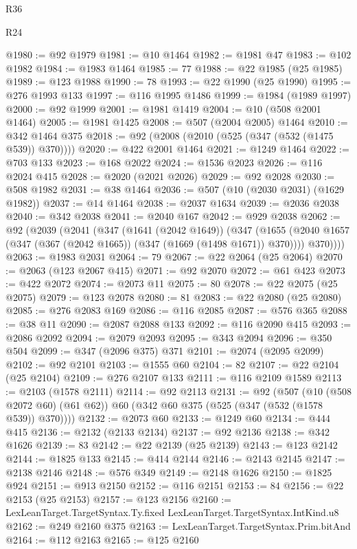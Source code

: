 \begin{lexlean}{R36}
\begin{lexlean}{R24}
\begin{coremodule}
{{{{{{{{{{{{{{{{{{{{{{{{{{{{{{{{{{{{{{{{{{{{{{{{{{{{{{{{{{{{{{{{{{{{{{{{{{{{{{{{{{{{{{{{{{{{{{{{{{{{{{{{{{{{{{{{{{{{{{{{{{{{{{{{{{{{{{{{{{{{{{{{{{{{{{{{{{{{{{{{{{{{{{{{{{{{{{{{{{{{{{{{{{{{{{{{{{{@1980 := @92 @1979
@1981 := @10 @1464
@1982 := @1981 @47
@1983 := @102 @1982
@1984 := @1983 @1464
@1985 := 77
@1988 := @22 @1985 (@25 @1985)
@1989 := @123 @1988
@1990 := 78
@1993 := @22 @1990 (@25 @1990)
@1995 := @276 @1993 @133
@1997 := @116 @1995 @1486
@1999 := @1984 (@1989 @1997)
@2000 := @92 @1999
@2001 := @1981 @1419
@2004 := @10 (@508 @2001 @1464)
@2005 := @1981 @1425
@2008 := @507 (@2004 @2005) @1464
@2010 := @342 @1464 @375
@2018 := @92 (@2008 (@2010 (@525 (@347 (@532 (@1475 @539)) @370))))
@2020 := @422 @2001 @1464
@2021 := @1249 @1464
@2022 := @703 @133
@2023 := @168 @2022
@2024 := @1536 @2023
@2026 := @116 @2024 @415
@2028 := @2020 (@2021 @2026)
@2029 := @92 @2028
@2030 := @508 @1982
@2031 := @38 @1464
@2036 := @507 (@10 (@2030 @2031) (@1629 @1982))
@2037 := @14 @1464
@2038 := @2037 @1634
@2039 := @2036 @2038
@2040 := @342 @2038
@2041 := @2040 @167
@2042 := @929 @2038
@2062 := @92
    (@2039
      (@2041
        (@347
          (@1641 (@2042 @1649))
          (@347
            (@1655 (@2040 @1657 (@347 (@367 (@2042 @1665)) (@347 (@1669 (@1498 @1671)) @370))))
            @370))))
@2063 := @1983 @2031
@2064 := 79
@2067 := @22 @2064 (@25 @2064)
@2070 := @2063 (@123 @2067 @415)
@2071 := @92 @2070
@2072 := @61 @423
@2073 := @422 @2072
@2074 := @2073 @11
@2075 := 80
@2078 := @22 @2075 (@25 @2075)
@2079 := @123 @2078
@2080 := 81
@2083 := @22 @2080 (@25 @2080)
@2085 := @276 @2083 @169
@2086 := @116 @2085
@2087 := @576 @365
@2088 := @38 @11
@2090 := @2087 @2088 @133
@2092 := @116 @2090 @415
@2093 := @2086 @2092
@2094 := @2079 @2093
@2095 := @343 @2094
@2096 := @350 @504
@2099 := @347 (@2096 @375) @371
@2101 := @2074 (@2095 @2099)
@2102 := @92 @2101
@2103 := @1555 @60
@2104 := 82
@2107 := @22 @2104 (@25 @2104)
@2109 := @276 @2107 @133
@2111 := @116 @2109 @1589
@2113 := @2103 (@1578 @2111)
@2114 := @92 @2113
@2131 := @92
    (@507
      (@10 (@508 @2072 @60) (@61 @62))
      @60
      (@342 @60 @375 (@525 (@347 (@532 (@1578 @539)) @370))))
@2132 := @2073 @60
@2133 := @1249 @60
@2134 := @444 @415
@2136 := @2132 (@2133 @2134)
@2137 := @92 @2136
@2138 := @342 @1626
@2139 := 83
@2142 := @22 @2139 (@25 @2139)
@2143 := @123 @2142
@2144 := @1825 @133
@2145 := @414 @2144
@2146 := @2143 @2145
@2147 := @2138 @2146
@2148 := @576 @349
@2149 := @2148 @1626
@2150 := @1825 @924
@2151 := @913 @2150
@2152 := @116 @2151
@2153 := 84
@2156 := @22 @2153 (@25 @2153)
@2157 := @123 @2156
@2160 := LexLeanTarget.TargetSyntax.Ty.fixed LexLeanTarget.TargetSyntax.IntKind.u8
@2162 := @249 @2160 @375
@2163 := LexLeanTarget.TargetSyntax.Prim.bitAnd
@2164 := @112 @2163
@2165 := @125 @2160
}}}}}}}}}}}}}}}}}}}}}}}}}}}}}}}}}}}}}}}}}}}}}}}}}}}}}}}}}}}}}}}}}}}}}}}}}}}}}}}}}}}}}}}}}}}}}}}}}}}}}}}}}}}}}}}}}}}}}}}}}}}}}}}}}}}}}}}}}}}}}}}}}}}}}}}}}}}}}}}}}}}}}}}}}}}}}}}}}}}}}}}}}}}}}}}}}}}
\end{coremodule}
\end{lexlean}
\end{lexlean}
